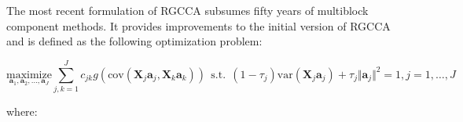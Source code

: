 \documentclass[
]{jss}
\begin{document}
The most recent formulation of RGCCA \citep{Tenenhaus2017} subsumes
fifty years of multiblock component methods. It provides improvements to
the initial version of RGCCA \citep{Tenenhaus2011} and is defined as the
following optimization problem:

\begin{equation}
\displaystyle \underset{\ensuremath{\mathbf{a}}_1,\ensuremath{\mathbf{a}}_2, \ldots,\ensuremath{\mathbf{a}}_J}{\text{maximize}} \sum_{j, k = 1}^J c_{jk}g(\mathrm{cov}(\mathbf{X}_j\ensuremath{\mathbf{a}}_j, \mathbf{X}_k\ensuremath{\mathbf{a}}_k)) \mathrm{~~s.t.~~} (1-\tau_j)\mathrm{var}(\mathbf{X}_j\ensuremath{\mathbf{a}}_j) + \tau_j\Vert \ensuremath{\mathbf{a}}_j \Vert^2 = 1, j=1, \ldots,J
\label{optim_RGCCA}
\end{equation}

where:
\end{document}
